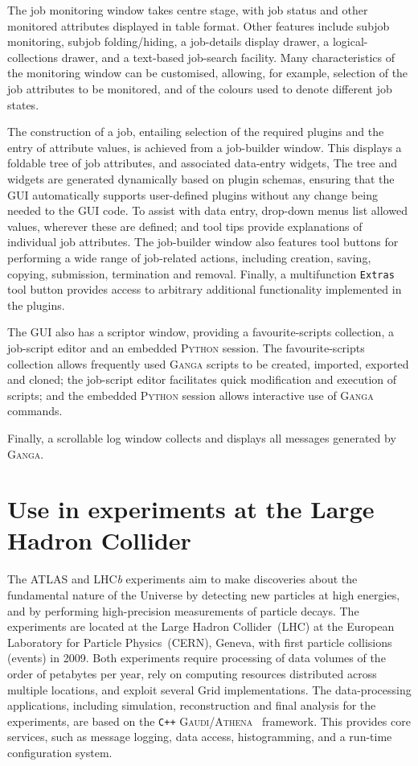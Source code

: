 \documentclass{elsart}
\def\lhcb {LHC{\em b\/}\xspace}
\def\atlas {ATLAS\xspace}
\def\lhc {LHC\xspace}
\def\ganga {\textsc{Ganga}\xspace}
\def\python {\textsc{Python}\xspace}
\def\gaudi {\textsc{Gaudi}\xspace}
\def\athena {\textsc{Athena}\xspace}
\def\grid {Grid\xspace}
\newcommand{\code}[1]{\texttt{#1}}
\begin{document}
The job monitoring window takes centre stage,
with job status and other monitored attributes displayed
in table format. Other features include subjob monitoring, subjob  
folding/hiding, a job-details display drawer, a logical-collections  
drawer, and a text-based job-search facility. Many characteristics of the
monitoring window can be customised, allowing, for example, selection of
the job attributes to be monitored, and of the colours used to denote
different job states.

The construction of a job, entailing selection of the required plugins and  
the entry of attribute values, is achieved from a job-builder window. This
displays a foldable tree of job attributes, and associated data-entry
widgets, The tree and widgets are generated dynamically based
on plugin schemas, ensuring that the GUI automatically supports
user-defined plugins without any change being needed to the GUI code.  To
assist with data entry, drop-down menus list allowed values, wherever
these are defined; and tool tips provide explanations of individual job
attributes.  The job-builder window also features tool buttons for
performing a wide range of job-related actions, including
creation, saving, copying, submission, termination and removal.  Finally,
a multifunction \code{Extras} tool button provides access to arbitrary
additional functionality implemented in the plugins.

The GUI also has a scriptor window, providing a
favourite-scripts collection, a job-script editor and an embedded \python
session.  The favourite-scripts collection allows frequently used \ganga
scripts to be created, imported, exported and cloned; the job-script editor
facilitates quick modification and execution of scripts; and the
embedded \python session allows interactive use of \ganga commands.

Finally, a scrollable log window collects and displays all messages  
generated by \ganga.


\section{Use in experiments at the Large Hadron Collider}
\label{sec:useHEP}

The \atlas and \lhcb experiments aim to make discoveries about the
fundamental nature of the Universe by detecting new particles at 
high energies, and by performing high-precision measurements of
particle decays. The experiments
are located at the Large Hadron Collider~(\lhc) at the European Laboratory for
Particle Physics~(CERN), Geneva, with first particle collisions (events) in
2009. Both experiments require processing of data
volumes of the order of petabytes per year, rely on computing resources
distributed across multiple locations, and exploit several \grid implementations. The data-processing applications,
including simulation, reconstruction and final analysis for the experiments,
are based on the \code{C++} \gaudi/\athena~\cite{gaudi} framework.  This
provides core services, such as message logging, data access, histogramming,
and a run-time configuration system. 
\end{document}

